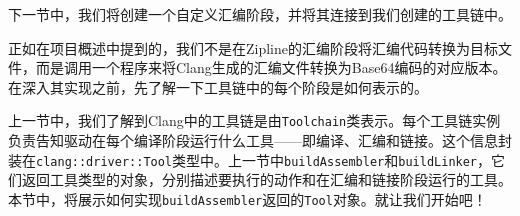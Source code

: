 下一节中，我们将创建一个自定义汇编阶段，并将其连接到我们创建的工具链中。


正如在项目概述中提到的，我们不是在Zipline的汇编阶段将汇编代码转换为目标文件，而是调用一个程序来将Clang生成的汇编文件转换为Base64编码的对应版本。在深入其实现之前，先了解一下工具链中的每个阶段是如何表示的。

上一节中，我们了解到Clang中的工具链是由\texttt{Toolchain}类表示。每个工具链实例负责告知驱动在每个编译阶段运行什么工具——即编译、汇编和链接。这个信息封装在\texttt{clang::driver::Tool}类型中。上一节中\texttt{buildAssembler}和\texttt{buildLinker}，它们返回工具类型的对象，分别描述要执行的动作和在汇编和链接阶段运行的工具。本节中，将展示如何实现\texttt{buildAssembler}返回的\texttt{Tool}对象。就让我们开始吧！

